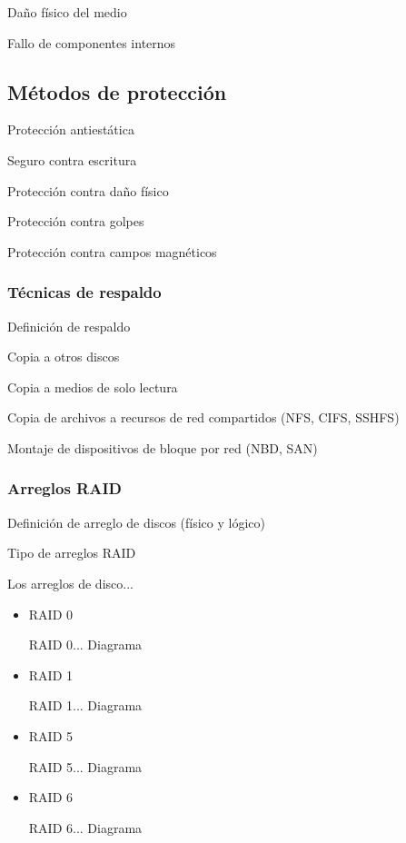 Da\~{n}o f\'{i}sico del medio

Fallo de componentes internos



      \subsection {M\'{e}todos de protecci\'{o}n}

Protecci\'{o}n antiest\'{a}tica

Seguro contra escritura

Protecci\'{o}n contra da\~{n}o f\'{i}sico

Protecci\'{o}n contra golpes

Protecci\'{o}n contra campos magn\'{e}ticos

        \subsubsection {T\'{e}cnicas de respaldo}

Definici\'{o}n de respaldo

Copia a otros discos

Copia a medios de solo lectura

Copia de archivos a recursos de red compartidos (NFS, CIFS, SSHFS)

Montaje de dispositivos de bloque por red (NBD, SAN)

        \subsubsection {Arreglos RAID}

Definici\'{o}n de arreglo de discos (f\'{i}sico y l\'{o}gico)

Tipo de arreglos RAID

Los arreglos de disco... \cite{8810bc4904cabf93eede72a03c171b7e}

\begin{itemize}

  \item RAID 0
  
RAID 0... Diagrama \cite{18b4e676f432f4780a509b508056c779}

  \item RAID 1
  
RAID 1... Diagrama \cite{0a250ce04fb10680f70cb2c3efd365b1}

  \item RAID 5
  
RAID 5... Diagrama \cite{9397b15f6a384de60446b869f05412af}

  \item RAID 6
  
RAID 6... Diagrama \cite{9e2f3e1ba21ce971703a62c6217946ae}
  
\end{itemize}

